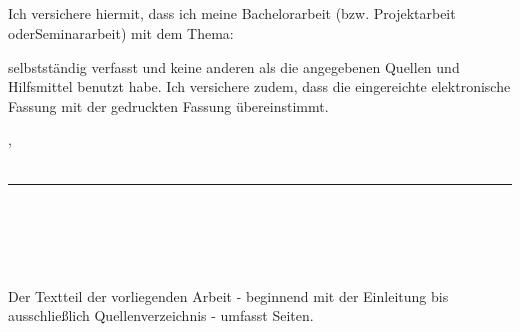 \begin{center}
\section*{\declarationHeading}
\end{center}
\noindent Ich versichere hiermit, dass ich meine Bachelorarbeit (bzw. Projektarbeit oder\linebreak Seminararbeit) mit dem Thema:

\begin{center}
\thesisTitle
\end{center}

\noindent selbstständig verfasst und keine anderen als die angegebenen Quellen und Hilfsmittel benutzt habe. Ich versichere zudem, dass die eingereichte elektronische Fassung mit der gedruckten Fassung übereinstimmt.

\vspace*{1.8cm}
\noindent \declarationLocation , \declarationDate \\
\vspace*{0.7cm} \\
\noindent\rule{8cm}{0.5pt} \\
\name \\
\vspace*{3cm} \\

\begin{center}
\section*{\thesisSizeHeading}
\end{center}
Der Textteil der vorliegenden Arbeit - beginnend mit der Einleitung bis ausschließlich Quellenverzeichnis - umfasst \pageref{pagesForDeclaration} Seiten.